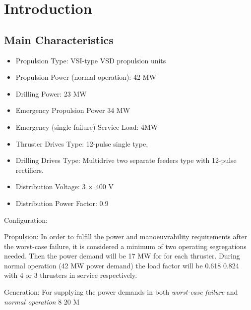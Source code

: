\section{Introduction}

\subsection{Main Characteristics}

\begin{itemize}
    \item Propulsion Type: VSI-type VSD propulsion units %
    \item Propulsion Power (normal operation): 42 MW
    \item Drilling Power: 23 MW
    \item Emergency Propulsion Power 34 MW
    \item Emergency (single failure) Service Load: 4MW
    \item Thruster Drives Type: 12-pulse single type, 
    \item Drilling Drives Type: Multidrive two separate feeders type with 12-pulse rectifiers.
    \item Distribution Voltage: 3 $ \times $ 400 V
    \item Distribution Power Factor: 0.9
\end{itemize}

Configuration:

Propulsion:
In order to fulfill the power and manoeuvrability requirements after the worst-case failure, it is considered a minimum of two operating segregations needed. Then the power demand will be 17 MW for for each thruster. During normal operation (42 MW power demand) the load factor will be 0.618 0.824 with 4 or 3 thrusters in service respectively. 

Generation:
For supplying the power demands in both \textit{worst-case failure} and \textit{normal operation} 8 20 M